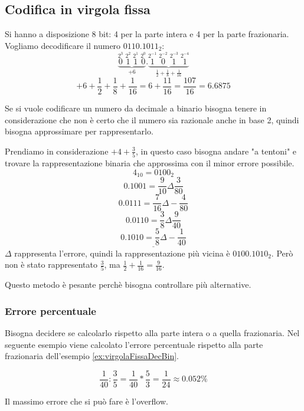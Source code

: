 \documentclass[a4paper]{article}
\theoremstyle{break}
\theoremstyle{break}
\theoremstyle{break}
\theoremstyle{break}
\begin{document}
\subsection{Codifica in virgola fissa}
\begin{example}
	Si hanno a disposizione 8 bit: 4 per la parte intera e 4 per la parte frazionaria.
	Vogliamo decodificare il numero \( 0110.1011_2 \):
	\Large\[
		\underbrace{\stackrel{2^{3}}{0}\;\stackrel{2^{2}}{1}\;\stackrel{2^{1}}{1}\;\stackrel{2^{0}}{0}}_{+6} .
		\underbrace{\stackrel{2^{-1}}{1}\;\stackrel{2^{-2}}{0}\;\stackrel{2^{-3}}{1}\;\stackrel{2^{-4}}{1}}_{\frac{1}{2}+\frac{1}{8}+\frac{1}{16}}
	\]
	\normalsize\[
		+6 + \frac{1}{2}+\frac{1}{8}+\frac{1}{16}= 6+\frac{11}{16} = \frac{107}{16} = 6.6875
	\]
\end{example}
Se si vuole codificare un numero da decimale a binario bisogna tenere in considerazione
che non è certo che il numero sia razionale anche in base 2, quindi bisogna
approssimare per rappresentarlo.

\begin{example}
	\label{ex:virgolaFissaDecBin}
	Prendiamo in considerazione \( +4 +\frac{3}{5} \), in questo caso bisogna andare
	"a tentoni" e trovare la rappresentazione binaria che approssima con il minor
	errore possibile.
	\[
		4_{10} = 0100_2
	\]
	\[
		0.1001 = \frac{9}{10} \Delta \frac{3}{80}
	\]
	\[
		0.0111 = \frac{7}{16} \Delta -\frac{4}{80}
	\]
	\[
		0.0110 = \frac{3}{8} \Delta \frac{9}{40}
	\]
	\[
		\underline{0.1010 = \frac{5}{8} \Delta -\frac{1}{40}}
	\]
	\( \Delta \) rappresenta l'errore, quindi la rappresentazione più vicina è
	\( 0100.1010_2 \). Però non è stato rappresentato \( \frac{3}{5} \), ma
	\( \frac{1}{2}+\frac{1}{16}=\frac{9}{16} \).
\end{example}
Questo metodo è pesante perchè bisogna controllare più alternative.

\subsubsection{Errore percentuale}
Bisogna decidere se calcolarlo rispetto alla parte intera o a quella frazionaria.
Nel seguente esempio viene calcolato l'errore percentuale rispetto alla parte
frazionaria dell'esempio \ref{ex:virgolaFissaDecBin}.
\begin{example}
	\[
		\frac{1}{40} : \frac{3}{5} = \frac{1}{40} * \frac{5}{3} = \frac{1}{24} \approx 0.052\%
	\]
\end{example}
Il massimo errore che si può fare è l'overflow.
\end{document}
